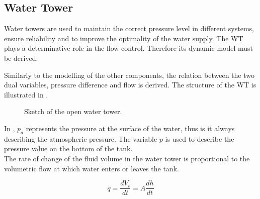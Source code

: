 \subsection{Water Tower} 
\label{WaterTankModel}

Water towers are used to maintain the correct pressure level in different systems, ensure reliability and to improve the optimality of the water supply. The WT plays a determinative role in the flow control. Therefore its dynamic model must be derived. 

Similarly to the modelling of the other components, the relation between the two dual variables, pressure difference and flow is derived. The structure of the WT is illustrated in .


\begin{figure}[H]
\centering
 
\caption{Sketch of the open water tower.}
\label{fig:watertower_sketch}
\end{figure}

In , $p_a$ represents the pressure at the surface of the water, thus is it always describing the atmospheric pressure. The variable $p$ is used to describe the pressure value on the bottom of the tank. \\
The rate of change of the fluid volume in the water tower is proportional to the volumetric flow at which water enters or leaves the tank. 

\begin{equation}
  q = \frac{dV_t}{dt} = A \frac{dh}{dt}
  \label{Flowequation}
\end{equation}

